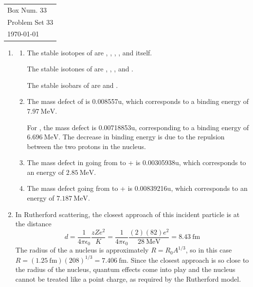 \documentclass[10pt]{article}
\begin{document}
  \begin{tabular}{l}
    Box Num. 33 \\
    Problem Set 33 \\
    \today
  \end{tabular}

  \begin{enumerate}
    \item \begin{enumerate}
        \item The stable isotopes of  are , , , , and  itself.

        The stable isotones of  are , , , and .

        The stable isobars of  are  and .

        \item The mass defect of  is 0.008557u, which corresponds to a binding energy of $\SI{7.97}{\mega\electronvolt}$.

        For , the mass defect is 0.00718853u, corresponding to a binding energy of $\SI{6.696}{\mega\electronvolt}$. The decrease in binding energy is due to the repulsion between the two protons in the  nucleus.

        \item The mass defect in going from  to  +  is 0.00305938u, which corresponds to an energy of $\SI{2.85}{\mega\electronvolt}$.

        \item The mass defect going from  to  +  is 0.00839216u, which corresponds to an energy of $\SI{7.187}{\mega\electronvolt}$.
    \end{enumerate}

    \item In Rutherford scattering, the closest approach of this incident particle is at the distance
    \begin{equation*}
        d = \frac{1}{4\pi\epsilon_0}\frac{zZe^2}{K} = \frac{1}{4\pi\epsilon_0}\frac{(2)(82)e^2}{\SI{28}{\mega\electronvolt}} =
        \SI{8.43}{\femto\meter}
    \end{equation*}
    The radius of the a nucleus is approximately $R = R_0 A^{1/3}$, so in this case $R = (\SI{1.25}{\femto\meter}) (208)^{1/3} = \SI{7.406}{\femto\meter}$. Since the closest approach is so close to the radius of the nucleus, quantum effects come into play and the nucleus cannot be treated like a point charge, as required by the Rutherford model.


\end{enumerate}
\end{document}
